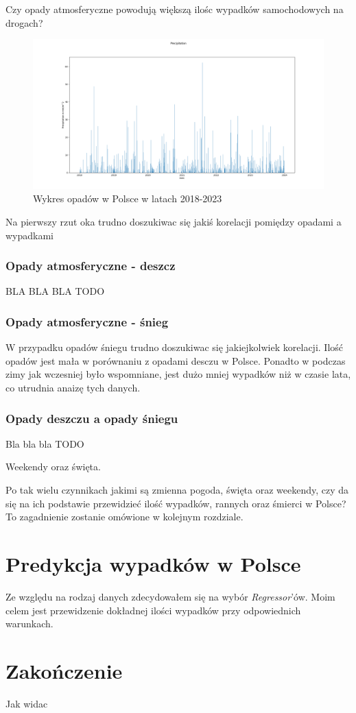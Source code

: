 \documentclass{article}
\begin{document}
Czy opady atmosferyczne powodują większą ilośc wypadków samochodowych na drogach?

\begin{figure}[h]
    \flushleft
    \includegraphics[width=1\textwidth]{visualization/precips.png}
    \caption{Wykres opadów w Polsce w latach 2018-2023 }
    \label{fig:precip_chart}
\end{figure}
Na pierwszy rzut oka trudno doszukiwac się jakiś korelacji pomiędzy opadami a wypadkami
\subsubsection{Opady atmosferyczne - deszcz}
BLA BLA BLA TODO 
\subsubsection{Opady atmosferyczne - śnieg}
W przypadku opadów śniegu trudno doszukiwac się jakiejkolwiek korelacji. Ilość opadów jest mała w porównaniu z opadami desczu w Polsce. 
Ponadto w podczas zimy jak wczesniej było wspomniane, jest dużo mniej wypadków niż w czasie lata, co utrudnia anaizę tych danych. 
\subsubsection{Opady deszczu a opady śniegu}
Bla bla bla TODO 

Weekendy oraz święta. 

Po tak wielu czynnikach jakimi są zmienna pogoda, święta oraz weekendy, czy da się na ich podstawie przewidzieć ilość wypadków, rannych oraz śmierci w Polsce?
To zagadnienie zostanie omówione w kolejnym rozdziale.

\section{Predykcja wypadków w Polsce}

Ze względu na rodzaj danych zdecydowałem się na wybór \textit{Regressor}'ów. Moim celem jest przewidzenie dokładnej ilości wypadków przy odpowiednich warunkach.



\section{Zakończenie}

Jak widac 
\end{document}
